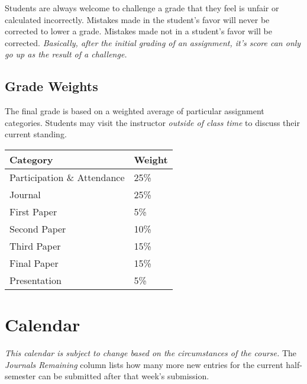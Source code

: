 \documentclass[nobib]{tufte-handout}
\begin{document}
Students are always welcome to challenge a grade that they feel is unfair or calculated incorrectly.  Mistakes made in the student's favor will never be corrected to lower a grade.  Mistakes made not in a student's favor will be corrected.  \textit{Basically, after the initial grading of an assignment, it's score can only go up as the result of a challenge.}


\subsection{Grade Weights}

The final grade is based on a weighted average of particular assignment categories.  Students may visit the instructor \textit{outside of class time} to discuss their current standing.  

\begin{center}
\begin{tabular}{ll}
Category & Weight  \\ \hline
Participation \& Attendance & 25\% \\
Journal & 25\% \\
First Paper & 5\% \\
Second Paper & 10\% \\
Third Paper & 15\% \\
Final Paper & 15\% \\
Presentation & 5\% \\
\end{tabular}
\end{center}


\section{Calendar}

\textit{This calendar is subject to change based on the circumstances of the course.}  The \textit{Journals Remaining} column lists how many more new entries for the current half-semester can be submitted after that week's submission.
\end{document}
